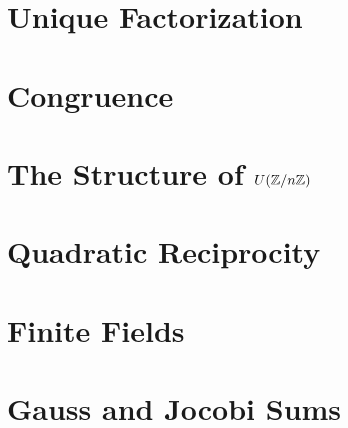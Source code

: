 \documentclass{mynotes}
\begin{document}
\tableofcontents
\chapter{Unique Factorization}






\chapter{Congruence}


\chapter{The Structure of $U(\mathbb{Z}/n\mathbb{Z})$}

\chapter{Quadratic Reciprocity}


\chapter{Finite Fields}





\chapter{Gauss and Jocobi Sums}



\end{document}
